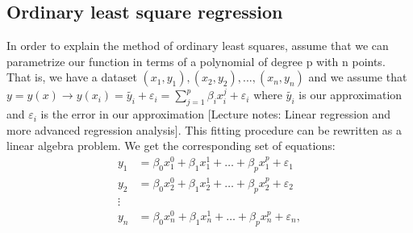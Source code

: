 \documentclass[a4paper,12pt]{article}
\begin{document}
\subsection{Ordinary least square regression}
In order to explain the method of ordinary least squares, assume that we can parametrize our function in terms of a polynomial of degree p with n points. That is, we have a dataset $(x_1, y_1), (x_2, y_2),..., (x_n, y_n)$ and we assume that $y = y(x) \rightarrow y(x_i) = \tilde{y_i} + \varepsilon_i = \sum_{j=1}^p{\beta_i x_i^j} + \varepsilon_i$ where $\tilde{y_i}$ is our approximation and $\varepsilon_i$ is the error in our approximation [Lecture notes: Linear regression and more advanced regression analysis].\newline
This fitting procedure can be rewritten as a linear algebra problem. We get the corresponding set of equations: 
\begin{align*}
y_1&=\beta_0x_1^0+\beta_1x_1^1+\hdots+\beta_px_1^p+\varepsilon_1\\
y_2&=\beta_0x_2^0+\beta_1x_2^1+\hdots+\beta_px_2^p+\varepsilon_2\\
\vdots\\
y_n&=\beta_0x_n^0+\beta_1x_n^1+\hdots+\beta_px_n^p+\varepsilon_n,
\end{align*}
\end{document}
